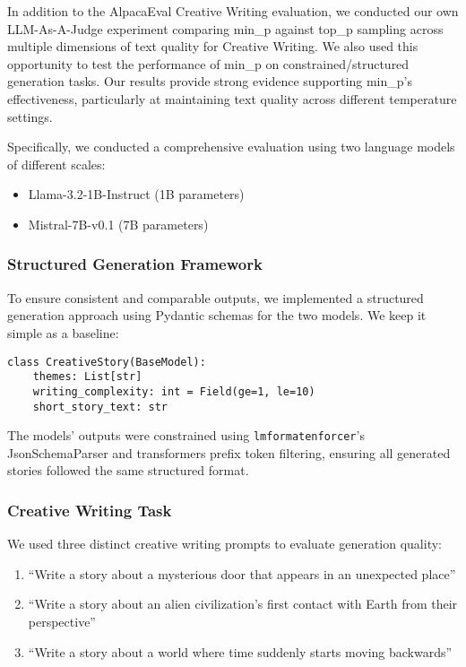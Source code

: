 \documentclass{article}
\begin{document}
In addition to the AlpacaEval Creative Writing evaluation, we conducted our own LLM-As-A-Judge experiment comparing min\_p against top\_p sampling across multiple dimensions of text quality for Creative Writing. We also used this opportunity to test the performance of min\_p on constrained/structured generation tasks. Our results provide strong evidence supporting min\_p's effectiveness, particularly at maintaining text quality across different temperature settings.

Specifically, we conducted a comprehensive evaluation using two language models of different scales:
\begin{itemize}
    \item Llama-3.2-1B-Instruct (1B parameters)
    \item Mistral-7B-v0.1 (7B parameters)
\end{itemize}

\subsubsection{Structured Generation Framework}

To ensure consistent and comparable outputs, we implemented a structured generation approach using Pydantic schemas for the two models. We keep it simple as a baseline:

\begin{verbatim}
class CreativeStory(BaseModel):
    themes: List[str]
    writing_complexity: int = Field(ge=1, le=10)    
    short_story_text: str
\end{verbatim}

The models' outputs were constrained using \texttt{lmformatenforcer}'s JsonSchemaParser and transformers prefix token filtering, ensuring all generated stories followed the same structured format.

\subsubsection{Creative Writing Task}

We used three distinct creative writing prompts to evaluate generation quality:
\begin{enumerate}
    \item ``Write a story about a mysterious door that appears in an unexpected place''
    \item ``Write a story about an alien civilization's first contact with Earth from their perspective''
    \item ``Write a story about a world where time suddenly starts moving backwards''
\end{enumerate}
\end{document}
